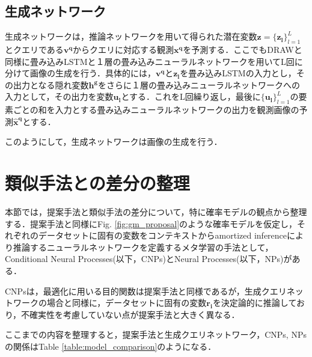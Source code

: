 \subsection{生成ネットワーク}
生成ネットワークは，推論ネットワークを用いて得られた潜在変数$\bm{z} = {\{ \bm{z_l} \}}_{l=1}^L$とクエリである$\bm{v^ q}$からクエリに対応する観測$\bm{x^q}$を予測する．ここでもDRAWと同様に畳み込みLSTMと１層の畳み込みニューラルネットワークを用いてL回に分けて画像の生成を行う．具体的には，$\bm{v ^ q}$と$\bm{z_l}$を畳み込みLSTMの入力とし，その出力となる隠れ変数$\bm{h^g}$をさらに１層の畳み込みニューラルネットワークへの入力として，その出力を変数$\bm{u_l}$とする．これをL回繰り返し，最後に${\{ \bm{u_l} \}}_{l=1}^L$の要素ごとの和を入力とする畳み込みニューラルネットワークの出力を観測画像の予測$\bm{\hat{x}^q}$とする．

このようにして，生成ネットワークは画像の生成を行う．

\section{類似手法との差分の整理}
本節では，提案手法と類似手法の差分について，特に確率モデルの観点から整理する．提案手法と同様にFig. \ref{fig:gm_proposal}のような確率モデルを仮定し，それぞれのデータセットに固有の変数をコンテキストからamortized inferenceにより推論するニューラルネットワークを定義するメタ学習の手法として，Conditional Neural Processes(以下，CNPs)\cite{CNP}とNeural Processes(以下，NPs)\cite{NP}がある．

CNPsは，最適化に用いる目的関数は提案手法と同様であるが，生成クエリネットワークの場合と同様に，データセットに固有の変数$\bm{r_i}$を決定論的に推論しており，不確実性を考慮していない点が提案手法と大きく異なる．


ここまでの内容を整理すると，提案手法と生成クエリネットワーク，CNPs, NPsの関係はTable \ref{table:model_comparison}のようになる．

\begin{table}[tbp]
  \begin{center}
  \caption{提案手法と類似手法の比較}
  \label{table:model_comparison}
  \end{center}
\end{table}

